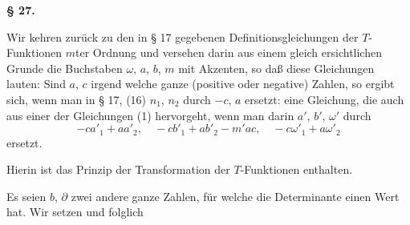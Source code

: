 \begin{center}

\textbf{}
\end{center}

\noindent\hrulefill

\begin{center}
\textbf{§ 27. }
\end{center}

Wir kehren zurück zu den in § 17 gegebenen Definitionsgleichungen
der $T$-Funktionen $m$ter Ordnung und versehen darin
aus einem gleich ersichtlichen Grunde die Buchstaben $\omega$, $a$, $b$, $m$
mit Akzenten, so daß diese Gleichungen lauten:
Sind $a$, $c$ irgend welche ganze (positive oder negative) Zahlen,
so ergibt sich, wenn man in § 17, (16) $n_1$, $n_2$ durch $-c$, $a$ ersetzt:
eine Gleichung, die auch aus einer der Gleichungen (1) hervorgeht,
wenn man darin $a'$, $b'$, $\omega'$ durch
\[
-ca'_1+aa'_2,\quad -cb'_1+ab'_2-m'ac,\quad -c\omega'_1+a\omega'_2
\]
ersetzt.

Hierin ist das Prinzip der Transformation der $T$-Funktionen
enthalten.

Es seien $b$, $\partial$ zwei andere ganze Zahlen, für welche die
Determinante
einen  Wert hat. Wir setzen
und folglich
